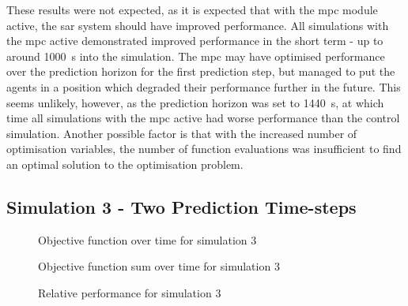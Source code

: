 \documentclass[conference]{IEEEtran}
\begin{document}
These results were not expected, as it is expected that with the \gls{mpc} module active, the \gls{sar} system should have improved performance.
All simulations with the \gls{mpc} active demonstrated improved performance in the short term - up to around \SI{1000}{\second} into the simulation.
The \gls{mpc} may have optimised performance over the prediction horizon for the first prediction step, but managed to put the agents in a position which degraded their performance further in the future.
This seems unlikely, however, as the prediction horizon was set to \SI{1440}{\second}, at which time all simulations with the \gls{mpc} active had worse performance than the control simulation.
Another possible factor is that with the increased number of optimisation variables, the number of function evaluations was insufficient to find an optimal solution to the optimisation problem.

\subsection{Simulation 3 - Two Prediction Time-steps} \label{subsec:results_SS03}

\begin{figure}[h]
    \centering
    
    \caption{Objective function over time for simulation 3}
    \label{fig:SS03_obj_hist}
\end{figure} 

%     

\begin{figure}[h]
    \centering
    
    \caption{Objective function sum over time for simulation 3}
    \label{fig:SS03_s_obj_hist}
\end{figure}

\begin{figure}[h]
    \centering
    
    \caption{Relative performance for simulation 3}
    \label{fig:SS03_s_obj_rel}
\end{figure}

\end{document}
